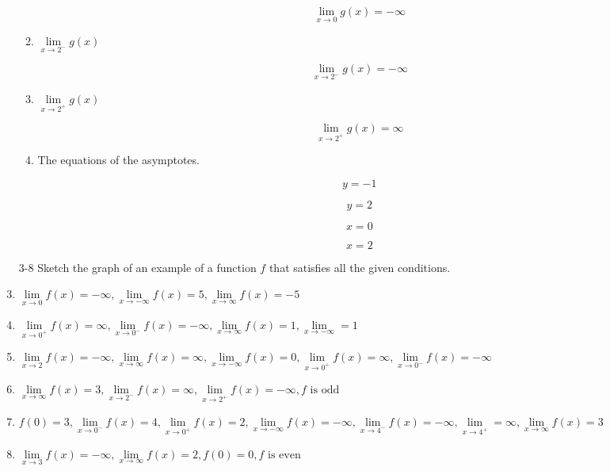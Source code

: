 \documentclass{article}
\begin{document}
\begin{enumerate}
\begin{enumerate}
			$$\lim \limits _{x \to 0} g(x) = -\infty$$

			\item $\lim \limits _{x \to 2^{-}} g(x)$

			$$\lim \limits _{x \to 2^{-}} g(x) = -\infty$$

			\item $\lim \limits _{x \to 2^{+}} g(x)$

			$$\lim \limits _{x \to 2^{+}} g(x) = \infty$$

			\item The equations of the asymptotes.

			$$y = -1$$

			$$y = 2$$

			$$x = 0$$

			$$x = 2$$
		\end{enumerate}

		\item[3-8] Sketch the graph of an example of a function $f$ that
			satisfies all the given conditions.


		\item $\lim \limits _{x \to 0} f(x) = -\infty, \lim \limits _{x \to -\infty} f(x) = 5,
			\lim \limits _{x \to \infty} f(x) = -5$


		\item $\lim \limits _{x \to 0^{+}} f(x) = \infty, \lim \limits _{x \to 0^{-}} f(x) = -\infty,
			\lim \limits _{x \to \infty} f(x) = 1, \lim \limits _{x \to -\infty} = 1$

		\item $\lim \limits _{x \to 2} f(x) = -\infty, \lim \limits _{x \to \infty} f(x) = \infty,
			\lim \limits _{x \to -\infty} f(x) = 0, \lim \limits _{x \to 0^{+}} f(x) = \infty,
			\lim \limits _{x \to 0^{-}} f(x) = -\infty$

		\item $\lim \limits _{x \to \infty} f(x) = 3, \lim \limits _{x \to 2^{-}} f(x) = \infty,
			\lim \limits _{x \to 2^{+}} f(x) = -\infty, f \text{ is odd}$

		\item $f(0) = 3, \lim \limits _{x \to 0^{-}} f(x) = 4, \lim \limits _{x \to 0^{+}} f(x) = 2,
			\lim \limits _{x \to -\infty} f(x) = -\infty, \lim \limits _{x \to 4^{-}} f(x) = -\infty,
			\lim \limits _{x \to 4^{+}} = \infty, \lim \limits _{x \to \infty} f(x) = 3$

		\item $\lim \limits _{x \to 3} f(x) = -\infty, \lim \limits _{x \to \infty} f(x) = 2,
			f(0) = 0, f \text{ is even}$


\end{enumerate}
\end{document}
